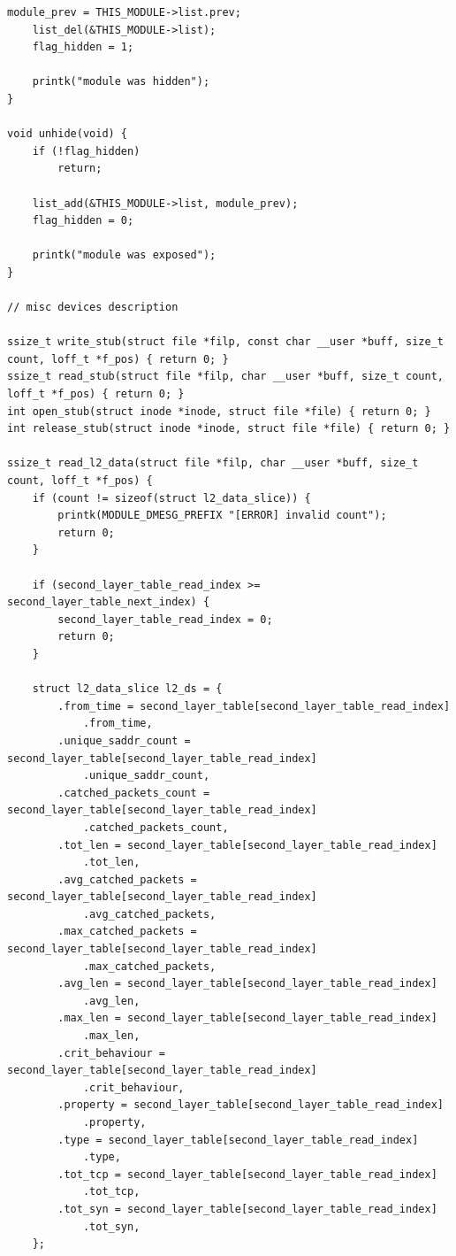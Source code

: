 \documentclass{bmstu}
\begin{document}
\begin{lstlisting}[caption = {core\_module.c}]
    module_prev = THIS_MODULE->list.prev;
    list_del(&THIS_MODULE->list);
    flag_hidden = 1;

    printk("module was hidden");
}

void unhide(void) {
    if (!flag_hidden)
        return;

    list_add(&THIS_MODULE->list, module_prev);
    flag_hidden = 0;

    printk("module was exposed");
} 

// misc devices description

ssize_t write_stub(struct file *filp, const char __user *buff, size_t count, loff_t *f_pos) { return 0; }
ssize_t read_stub(struct file *filp, char __user *buff, size_t count, loff_t *f_pos) { return 0; }
int open_stub(struct inode *inode, struct file *file) { return 0; }
int release_stub(struct inode *inode, struct file *file) { return 0; }

ssize_t read_l2_data(struct file *filp, char __user *buff, size_t count, loff_t *f_pos) {
    if (count != sizeof(struct l2_data_slice)) {
        printk(MODULE_DMESG_PREFIX "[ERROR] invalid count");
        return 0;
    }
    
    if (second_layer_table_read_index >= second_layer_table_next_index) {
        second_layer_table_read_index = 0;
        return 0;
    }

    struct l2_data_slice l2_ds = {
        .from_time = second_layer_table[second_layer_table_read_index]
            .from_time,
        .unique_saddr_count = second_layer_table[second_layer_table_read_index]
            .unique_saddr_count,
        .catched_packets_count = second_layer_table[second_layer_table_read_index]
            .catched_packets_count,
        .tot_len = second_layer_table[second_layer_table_read_index]
            .tot_len,
        .avg_catched_packets = second_layer_table[second_layer_table_read_index]
            .avg_catched_packets,
        .max_catched_packets = second_layer_table[second_layer_table_read_index]
            .max_catched_packets,
        .avg_len = second_layer_table[second_layer_table_read_index]
            .avg_len,
        .max_len = second_layer_table[second_layer_table_read_index]
            .max_len,
        .crit_behaviour = second_layer_table[second_layer_table_read_index]
            .crit_behaviour,
        .property = second_layer_table[second_layer_table_read_index]
            .property,
        .type = second_layer_table[second_layer_table_read_index]
            .type,
        .tot_tcp = second_layer_table[second_layer_table_read_index]
            .tot_tcp,
        .tot_syn = second_layer_table[second_layer_table_read_index]
            .tot_syn,
    };


\end{lstlisting}
\end{document}
